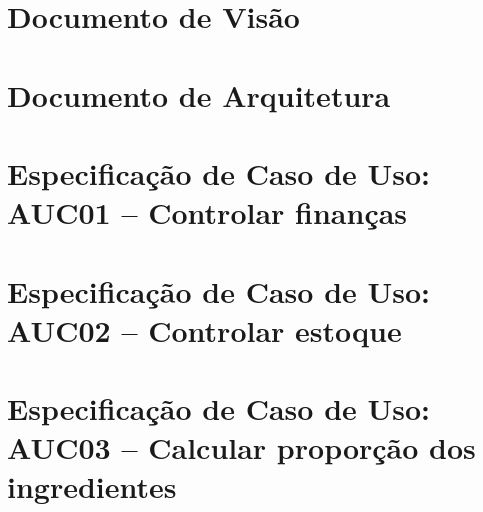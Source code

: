 \begin{anexosenv}
\partanexos
\chapter{Documento de Visão} \label{doc:visao}


\chapter{Documento de Arquitetura} \label{doc:arq}


\chapter{Especificação de Caso de Uso: AUC01 -- Controlar finanças} \label{doc:auc01}


\chapter{Especificação de Caso de Uso: AUC02 -- Controlar estoque} \label{doc:auc02}


\chapter{Especificação de Caso de Uso: AUC03 -- Calcular proporção dos ingredientes} \label{doc:auc03}


\end{anexosenv}
